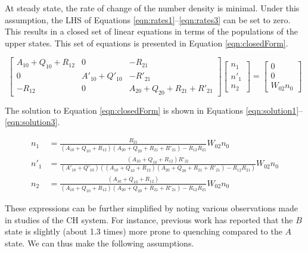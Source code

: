 At steady state, the rate of change of the number density is minimal.
Under this assumption, the LHS of Equations \ref{eqn:rates1}--\ref{eqn:rates3} can be set to zero.
This results in a closed set of linear equations in terms of the populations of the upper states.
This set of equations is presented in Equation \ref{eqn:closedForm}.

\begin{equation}
  \left[
    \begin{matrix}
      A_{10} + Q_{10} + R_{12} & 0 & -R_{21}\\
      0 & A'_{10} + Q'_{10} & -R'_{21}\\
      -R_{12} & 0 & A_{20} + Q_{20} + R_{21} + R'_{21}
    \end{matrix}
  \right]\left[
    \begin{matrix}
      n_1\\
      n'_1\\
      n_2
    \end{matrix}
  \right] = \left[
    \begin{matrix}
      0\\
      0\\
      W_{02}n_0
    \end{matrix}
  \right]
  \label{eqn:closedForm}
\end{equation}

The solution to Equation \ref{eqn:closedForm} is shown in Equations \ref{eqn:solution1}--\ref{eqn:solution3}.

\begin{align}
  n_1 &= \frac{ R_{21} }{ ( A_{10} + Q_{10} + R_{12} )( A_{20} + Q_{20} + R_{21} + R'_{21} ) - R_{12}R_{21} }W_{02}n_0
  \label{eqn:solution1}\\
  n'_1 &= \frac{ ( A_{10} + Q_{10} + R_{12} )R'_{21} }{ ( A'_{10} + Q'_{10} ) ( ( A_{10} + Q_{10} + R_{12} )( A_{20} + Q_{20} + R_{21} + R'_{21} ) - R_{12}R_{21} ) }W_{02}n_0
  \label{eqn:solution2}\\
  n_2 &= \frac{ ( A_{10} + Q_{10} + R_{12} ) }{ ( A_{10} + Q_{10} + R_{12} )( A_{20} + Q_{20} + R_{21} + R'_{21} ) - R_{12}R_{21} }W_{02}n_0
  \label{eqn:solution3}
\end{align}

These expressions can be further simplified by noting various observations made in studies of the CH system.
For instance, previous work\cite{1984-cool,1985-garland-b} has reported that the \(B\) state is slightly (about 1.3 times) more prone to quenching compared to the \(A\) state.
We can thus make the following assumptions.

